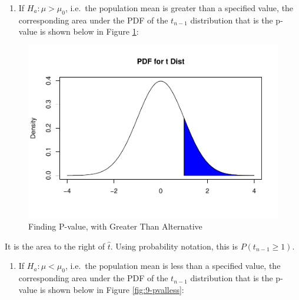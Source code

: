 \documentclass[
]{book}
\providecommand{\tightlist}{%
  \setlength{\itemsep}{0pt}\setlength{\parskip}{0pt}}
\begin{document}
\begin{enumerate}
\def\labelenumi{\arabic{enumi}.}
\setcounter{enumi}{1}
\tightlist
\item
  If \(H_a: \mu > \mu_0\), i.e.~the population mean is greater than a specified value, the corresponding area under the PDF of the \(t_{n-1}\) distribution that is the p-value is shown below in Figure \ref{fig:9-pvalgreater}:
\end{enumerate}

\begin{figure}
\centering
\includegraphics{bookdown-demo_files/figure-latex/9-pvalgreater-1.pdf}
\caption{\label{fig:9-pvalgreater}Finding P-value, with Greater Than Alternative}
\end{figure}

It is the area to the right of \(\hat{t}\). Using probability notation, this is \(P(t_{n-1} \geq 1)\).

\begin{enumerate}
\def\labelenumi{\arabic{enumi}.}
\setcounter{enumi}{2}
\tightlist
\item
  If \(H_a: \mu < \mu_0\), i.e.~the population mean is less than a specified value, the corresponding area under the PDF of the \(t_{n-1}\) distribution that is the p-value is shown below in Figure \ref{fig:9-pvalless}:
\end{enumerate}
\end{document}
